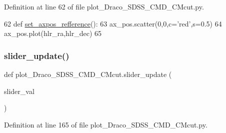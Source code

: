 Definition at line 62 of file plot\+\_\+\+Draco\+\_\+\+S\+D\+S\+S\+\_\+\+C\+M\+D\+\_\+\+C\+Mcut.\+py.


\begin{DoxyCode}
62 \textcolor{keyword}{def }\hyperlink{namespaceplot__Draco__SDSS__CMD__CMcut_acfc5ebd089fe79d0c0687af77f2fdeb4}{set\_axpos\_refference}():
63     ax\_pos.scatter(0,0,c=\textcolor{stringliteral}{'red'},s=0.5)
64     ax\_pos.plot(hlr\_ra,hlr\_dec)
65 
\end{DoxyCode}
\mbox{\label{namespaceplot__Draco__SDSS__CMD__CMcut_a9bc5b2b68855c01a286faea241fb5940}} 
\subsubsection{\texorpdfstring{slider\+\_\+update()}{slider\_update()}}
{\footnotesize\ttfamily def plot\+\_\+\+Draco\+\_\+\+S\+D\+S\+S\+\_\+\+C\+M\+D\+\_\+\+C\+Mcut.\+slider\+\_\+update (\begin{DoxyParamCaption}\item[{}]{slider\+\_\+val }\end{DoxyParamCaption})}



Definition at line 165 of file plot\+\_\+\+Draco\+\_\+\+S\+D\+S\+S\+\_\+\+C\+M\+D\+\_\+\+C\+Mcut.\+py.



